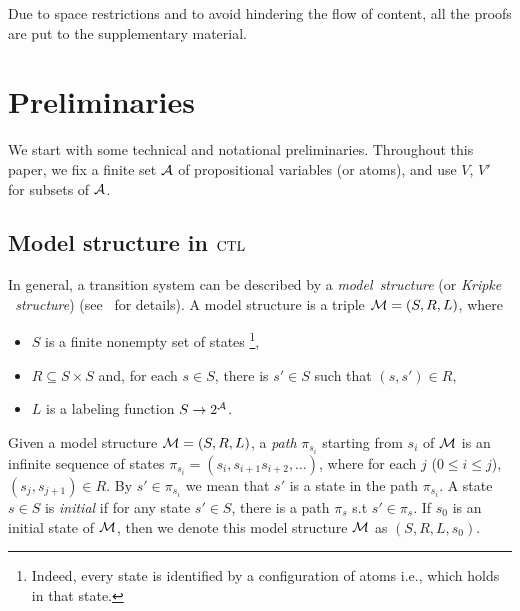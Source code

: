 \documentclass[letterpaper]{article} %
\begin{document}
Due to space restrictions and to avoid hindering the flow of content, all the proofs are put to the supplementary material.



\section{Preliminaries}
 We start with some technical and notational preliminaries. Throughout this paper, we fix a finite set ${\cal A}$ of propositional variables (or atoms), and use $V$, $V'$ for subsets of ${\cal A}$.
\subsection{Model structure in $\textrm{CTL}$}
In general, a transition system
 can be described by a \emph{model\ structure} (or \emph{Kripke \ structure}) (see~\cite{Baier:PMC:2008} for details). A model structure is a triple ${\cal M}=(S,R,L)$, where
\begin{itemize}
  \item $S$ is a finite nonempty set of states \footnote{Indeed, every state is identified by a configuration of atoms i.e., which holds in that state.},
  \item $R\subseteq S\times S$ and, for each $s\in S$, there
  is $s'\in S$ such that $(s,s')\in R$,
  \item $L$ is a labeling function $S\rightarrow 2^{\cal A}$.
\end{itemize}
Given a model structure ${\cal M}=(S,R,L)$, a \emph{path} $\pi_{s_i}$ starting from $s_i$ of ${\cal M}$ is an infinite sequence of states $\pi_{s_i}=(s_i, s_{i+1} s_{i+2},\dots)$, where for each $j$ ($0\leq i\leq j$), $(s_j, s_{j+1}) \in R$. By $s'\in \pi_{s_i}$ we mean that $s'$ is a state in the path $\pi_{s_i}$.
A state $s\in S$ is {\em initial} if for any state $s'\in S$, there is a path $\pi_s$ s.t $s'\in \pi_s$.
If $s_0$ is an initial state of ${\cal M}$, then we denote this model structure ${\cal M}$ as $(S,R,L,s_0)$.
\end{document}
